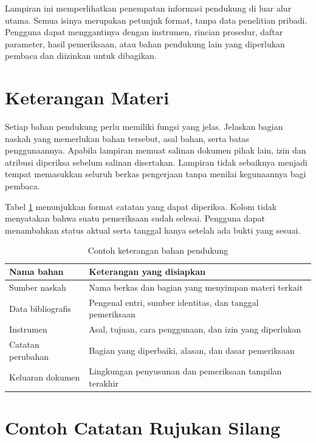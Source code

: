 \label{lamp:contoh}

Lampiran ini memperlihatkan penempatan informasi pendukung di luar alur utama. Semua isinya merupakan petunjuk format, tanpa data penelitian pribadi. Pengguna dapat menggantinya dengan instrumen, rincian prosedur, daftar parameter, hasil pemeriksaan, atau bahan pendukung lain yang diperlukan pembaca dan diizinkan untuk dibagikan.

\section*{Keterangan Materi}

Setiap bahan pendukung perlu memiliki fungsi yang jelas. Jelaskan bagian naskah yang memerlukan bahan tersebut, asal bahan, serta batas penggunaannya. Apabila lampiran memuat salinan dokumen pihak lain, izin dan atribusi diperiksa sebelum salinan disertakan. Lampiran tidak sebaiknya menjadi tempat memasukkan seluruh berkas pengerjaan tanpa menilai kegunaannya bagi pembaca.

Tabel \ref{tab:contoh-lampiran} menunjukkan format catatan yang dapat diperiksa. Kolom tidak menyatakan bahwa suatu pemeriksaan sudah selesai. Pengguna dapat menambahkan status aktual serta tanggal hanya setelah ada bukti yang sesuai.

\begin{table}[htbp]
  \centering
  \caption{Contoh keterangan bahan pendukung}
  \label{tab:contoh-lampiran}
  \begin{tabular}{p{4.0cm}p{8.6cm}}
    \toprule
    Nama bahan & Keterangan yang disiapkan \\
    \midrule
    Sumber naskah & Nama berkas dan bagian yang menyimpan materi terkait \\
    Data bibliografis & Pengenal entri, sumber identitas, dan tanggal pemeriksaan \\
    Instrumen & Asal, tujuan, cara penggunaan, dan izin yang diperlukan \\
    Catatan perubahan & Bagian yang diperbaiki, alasan, dan dasar pemeriksaan \\
    Keluaran dokumen & Lingkungan penyusunan dan pemeriksaan tampilan terakhir \\
    \bottomrule
  \end{tabular}
\end{table}

\section*{Contoh Catatan Rujukan Silang}

